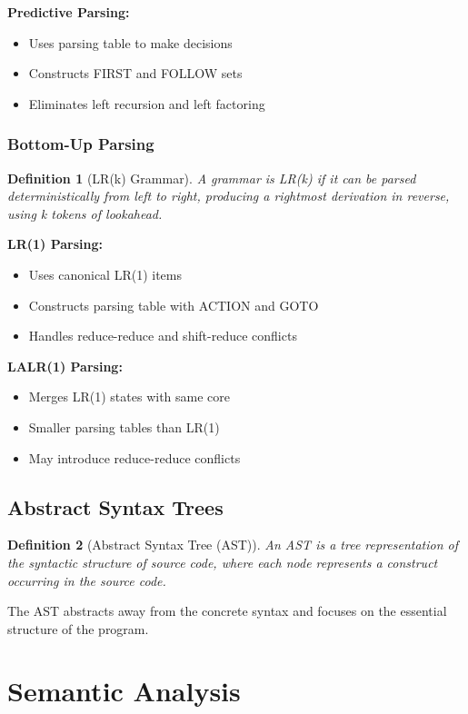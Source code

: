 \documentclass[11pt]{article}
\newtheorem{definition}{Definition}[section]
\begin{document}
\textbf{Predictive Parsing:}
\begin{itemize}
    \item Uses parsing table to make decisions
    \item Constructs FIRST and FOLLOW sets
    \item Eliminates left recursion and left factoring
\end{itemize}

\subsubsection{Bottom-Up Parsing}

\begin{definition}[LR(k) Grammar]
A grammar is LR(k) if it can be parsed deterministically from left to right, producing a rightmost derivation in reverse, using k tokens of lookahead.
\end{definition}

\textbf{LR(1) Parsing:}
\begin{itemize}
    \item Uses canonical LR(1) items
    \item Constructs parsing table with ACTION and GOTO
    \item Handles reduce-reduce and shift-reduce conflicts
\end{itemize}

\textbf{LALR(1) Parsing:}
\begin{itemize}
    \item Merges LR(1) states with same core
    \item Smaller parsing tables than LR(1)
    \item May introduce reduce-reduce conflicts
\end{itemize}

\subsection{Abstract Syntax Trees}

\begin{definition}[Abstract Syntax Tree (AST)]
An AST is a tree representation of the syntactic structure of source code, where each node represents a construct occurring in the source code.
\end{definition}

The AST abstracts away from the concrete syntax and focuses on the essential structure of the program.

\section{Semantic Analysis}
\end{document}
